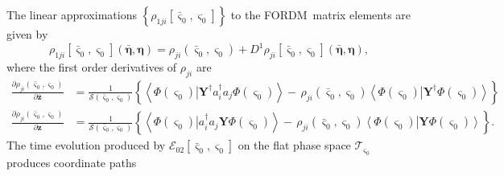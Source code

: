 \documentclass[aps,preprint]{revtex4}%
\begin{document}
The linear approximations $\left\{  \rho_{1ji}\left[  \mathbf{\bar{\varsigma}%
}_{0},\mathbf{\varsigma}_{0}\right]  \right\}  $ to the FORDM\ matrix elements
are given by
\begin{equation}
\rho_{1ji}\left[  \mathbf{\bar{\varsigma}}_{0},\mathbf{\varsigma}_{0}\right]
\left(  \mathbf{\bar{\eta},\eta}\right)  =\rho_{ji}\left(  \mathbf{\bar
{\varsigma}}_{0},\mathbf{\varsigma}_{0}\right)  +D^{1}\rho_{ji}\left[
\mathbf{\bar{\varsigma}}_{0},\mathbf{\varsigma}_{0}\right]  \left(
\mathbf{\bar{\eta},\eta}\right)  , \label{linapprox}%
\end{equation}
where the first order derivatives of $\rho_{ji}$ are
\begin{align}
\frac{\partial\rho_{ji}\left(  \mathbf{\bar{\varsigma}}_{0},\mathbf{\varsigma
}_{0}\right)  }{\partial\mathbf{\bar{z}}}  &  =\frac{1}{\mathcal{S}\left(
\mathbf{\bar{\varsigma}}_{0},\mathbf{\varsigma}_{0}\right)  }\left\{
\left\langle \left.  \Phi\left(  \mathbf{\varsigma}_{0}\right)  \right\vert
\mathbf{Y}^{\dagger}a_{i}^{\dagger}a_{j}\Phi\left(  \mathbf{\varsigma}%
_{0}\right)  \right\rangle -\,\rho_{ji}\left(  \mathbf{\bar{\varsigma}}%
_{0},\mathbf{\varsigma}_{0}\right)  \left\langle \left.  \Phi\left(
\mathbf{\varsigma}_{0}\right)  \right\vert \mathbf{Y}^{\dagger}\Phi\left(
\mathbf{\varsigma}_{0}\right)  \right\rangle \right\} \nonumber\\
\frac{\partial\rho_{ji}\left(  \mathbf{\bar{\varsigma}}_{0},\mathbf{\varsigma
}_{0}\right)  }{\partial\mathbf{z}}  &  =\frac{1}{\mathcal{S}\left(
\mathbf{\bar{\varsigma}}_{0},\mathbf{\varsigma}_{0}\right)  }\left\{
\left\langle \left.  \Phi\left(  \mathbf{\varsigma}_{0}\right)  \right\vert
a_{i}^{\dagger}a_{j}\mathbf{Y}\Phi\left(  \mathbf{\varsigma}_{0}\right)
\right\rangle -\,\rho_{ji}\left(  \mathbf{\bar{\varsigma}}_{0}%
,\mathbf{\varsigma}_{0}\right)  \left\langle \left.  \Phi\left(
\mathbf{\varsigma}_{0}\right)  \right\vert \mathbf{Y}\Phi\left(
\mathbf{\varsigma}_{0}\right)  \right\rangle \right\}  .
\end{align}
The time evolution produced by $\mathcal{E}_{02}\left[  \mathbf{\bar
{\varsigma}}_{0},\mathbf{\varsigma}_{0}\right]  $ on the flat phase space
$\mathcal{T}_{\mathbf{\varsigma}_{0}}$ produces coordinate paths
\end{document}
